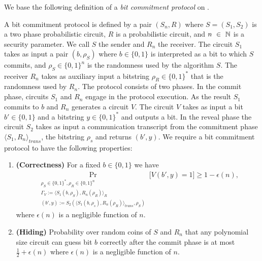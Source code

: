 We base the following definition of a \textit{bit commitment protocol} on \cite{LectureNotesComThCrypto}.
\begin{definition}
  \label{def:bit_commitment}
A \textnormal{bit commitment protocol} is defined by a pair $(S_n, R)$
where $S = (S_1, S_2)$ is a two phase probabilistic circuit, $R$ is a probabilistic circuit, and
$n~\in~\mathbb{N}$ is a security parameter.
We call $S$ the sender and $R_n$ the receiver. The circuit $S_1$ takes as input a pair $(b, \rho_S)$
where $b \in \{0,1\}$ is interpreted as a bit to which $S$ commits, and $\rho_S \in \{0,1\}^{n}$ is the randomness used by the algorithm $S$.
The receiver $R_n$ takes as auxiliary input a bitstring $\rho_R \in \{0,1\}^{*}$ that is the randomness used by $R_n$.
The protocol consists of two phases. In the \textnormal{commit phase}, circuits $S_1$ and $R_n$ engage in the protocol execution.
As the result $S_1$ commits to $b$ and $R_n$ generates a circuit $V$.
The circuit $V$ takes as input a bit $b' \in \{0,1\}$ and a bitstring $y \in \{0,1\}^{*}$ and outputs a bit.
In the \textnormal{reveal phase} the circuit $S_2$ takes as input a communication transcript from the commitment phase
$\langle S_1, R_n \rangle_{\mathit{trans}}$, the bitstring $\rho_s$ and returns $(b', y)$.
We require a bit commitment protocol to have the following properties:
\begin{enumerate}[]
\item{\textnormal{\textbf{(Correctness)}}} For a fixed $b \in \{0,1\}$ we have
  \begin{align*}
    \underset{\substack{\rho_S \in \{0,1\}^{*}, \rho_R \in \{0,1\}^{n} \\
        \Gamma_V := \langle S_1(b,\rho_S), R_n(\rho_R) \rangle_{R} \\
        (b',y) := S_2(\langle S_1(b,\rho_s), R_n(\rho_R) \rangle_{\mathit{trans}},\rho_S)}}{\Pr}\Big[V(b',y) = 1 \Big] \geq 1 - \epsilon(n),
  \end{align*}
where $\epsilon(n)$ is a negligible function of $n$.
\item{\textnormal{\textbf{(Hiding)}}}
  Probability over random coins of $S$ and $R_n$ that any polynomial size circuit
  can guess bit $b$ correctly after the commit phase is at most $\frac{1}{2} + \epsilon(n)$ where $\epsilon(n)$ is a negligible function of $n$.

\end{enumerate}
\end{definition}
